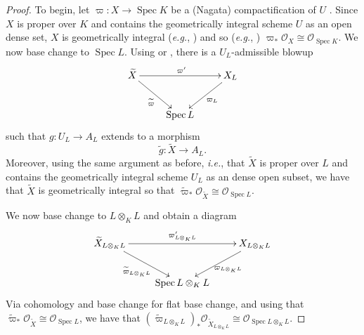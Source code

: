 \documentclass[11pt, reqno]{amsart}
\numberwithin{equation}{section}
\theoremstyle{definition}
\theoremstyle{remark}
\def\iso{\cong}
\DeclareMathOperator{\spec}{Spec}
\begin{document}
\begin{proof}
To begin, let $\varpi:X\to \spec K$ be a (Nagata) compactification of $U$ \cite{conradNagata}. Since
$X$ is proper over $K$ and contains the geometrically integral scheme
$U$ as an open dense set,  $X$ is geometrically integral (\emph{e.g.},
\cite[Prop.~5.51(iii)]{GW20})  and so
 (\emph{e.g.}, \cite[\href{https://stacks.math.columbia.edu/tag/0FD2}{Lem.~0FD2}]{stacks-project})
$
  \varpi_*\mathcal O_X  \iso \mathcal O_{\spec K}$. 
   We now base change to $\operatorname{Spec}L$.  
Using \cite[Lem.~2.2]{lutkebohmert93} or \cite[Rem.~2.5]{conradNagata}, there is a
$U_{L}$-admissible blowup 
    \[
\xymatrix{
\widetilde X \ar[rr]^{\varpi'} \ar[dr]_{\widetilde\varpi} & &X_{L}\ar[dl]^{\varpi_L} \\
& \spec L
}
\]
such that $g:U_L\to A_L$ extends to a morphism
$$\widetilde{g}:\widetilde X \to A_{L}.$$  Moreover, using the same argument as before, \emph{i.e.}, that 
$\widetilde X$ is proper over $L$ and contains the geometrically integral scheme
$U_L$ as an dense open subset,  we have that  $\widetilde X$ is geometrically integral  so that 
$
  \tilde \varpi_*\mathcal O_{\widetilde X}  \iso \mathcal O_{\spec L}$. 


We now base change to $L\otimes_KL$ and obtain a diagram 
\[
\xymatrix{
\widetilde X_{L\otimes_KL} \ar[rr]^{\varpi'_{L\otimes_K L}} \ar[dr]_{\widetilde\varpi_{L\otimes_KL}} & &X_{L\otimes_KL}\ar[dl]^{\varpi _{L\otimes_KL}} \\
& \spec L\otimes_KL
}
\]
Via cohomology and base change for flat base change, and using that $
  \tilde \varpi_*\mathcal O_{\widetilde X}  \iso \mathcal O_{\spec L}$, we have  that
$(\tilde \varpi_{L\otimes_KL})_* \mathcal O_{\widetilde X_{L\otimes_KL}}  \iso \mathcal O_{\spec
                                                L\otimes_KL}$.
                                                
                                               
                                                

\end{proof}
\end{document}
